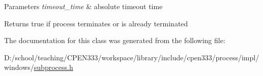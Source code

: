 \begin{DoxyParams}{Parameters}
{\em timeout\+\_\+time} & absolute timeout time \\
\hline
\end{DoxyParams}
\begin{DoxyReturn}{Returns}
true if process terminates or is already terminated 
\end{DoxyReturn}


The documentation for this class was generated from the following file\+:\begin{DoxyCompactItemize}
\item 
D\+:/school/teaching/\+C\+P\+E\+N333/workspace/library/include/cpen333/process/impl/windows/\hyperlink{impl_2windows_2subprocess_8h}{subprocess.\+h}\end{DoxyCompactItemize}
